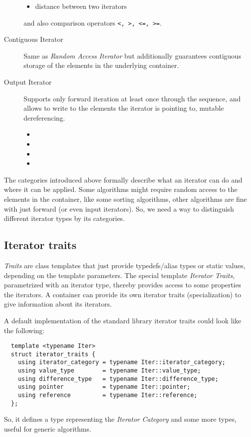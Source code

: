 \begin{description}
\begin{itemize}
      \item {} distance between two iterators
    \end{itemize}
    and also comparison operators \texttt{<, >, <=, >=}.
  \item[Contiguous Iterator]
    Same as \emph{Random Access Iterator} but additionally guarantees contiguous storage of the elements in the underlying container.
  \item[Output Iterator]
    Supports only forward iteration at least once through the sequence, and allows to write to the elements the iterator is pointing to, \ie mutable dereferencing.
    \begin{itemize}
      \item {}
      \item {}
      \item {}
      \item {}
    \end{itemize}
\end{description}

The categories introduced above formally describe what an iterator can do and where it can be applied. Some algorithms might require random access to
the elements in the container, like some sorting algorithms, other algorithms are fine with just forward (or even input iterators).
So, we need a way to distinguish different iterator types by its categories.

\subsection{Iterator traits}
\emph{Traits} are class templates that just provide typedefs/alias types or static values, depending on the template parameters. The special template
\emph{Iterator Traits}, parametrized with an iterator type, thereby provides access to some properties the iterators. A container can provide its
own iterator traits (specialization) to give information about its iterators.

A default implementation of the standard library iterator traits could look like the following:
\begin{verbatim}
  template <typename Iter>
  struct iterator_traits {
    using iterator_category = typename Iter::iterator_category;
    using value_type        = typename Iter::value_type;
    using difference_type   = typename Iter::difference_type;
    using pointer           = typename Iter::pointer;
    using reference         = typename Iter::reference;
  };
\end{verbatim}
%
So, it defines a type representing the \emph{Iterator Category} and some more types, useful for generic algorithms.

